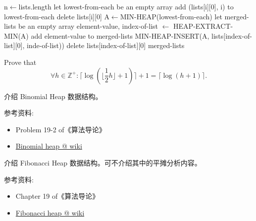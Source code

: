 \documentclass[a4paper, justified]{tufte-handout}
\begin{document}
\begin{problem}[TC 6.5-9]
\end{problem}

\begin{solution}
  \begin{algorithm}
    \begin{algorithmic}
      \State n$\gets$lists.length
      \State let lowest-from-each be an empty array
      \State add (lists[i][0], i) to lowest-from-each
      \State delete lists[i][0]
      \EndFor
      \State A$\gets$MIN-HEAP(lowest-from-each)
      \State let merged-lists be an empty array
      \State element-value, index-of-list $\gets$ HEAP-EXTRACT-MIN(A)
      \State add element-value to merged-lists
      \State MIN-HEAP-INSERT(A, lists[index-of-list][0], inde-of-list))
      \State delete lists[index-of-list][0]
      \EndIf
      \EndWhile
      \Return merged-lists
      \EndProcedure
    \end{algorithmic}
  \end{algorithm}
\end{solution}

\beginoptional

\begin{problem}
Prove that
\[
  \forall h \in \mathbb{Z}^{+}: \lceil \log(\lfloor \frac{1}{2}h \rfloor + 1) \rceil + 1 = \lceil \log (h + 1) \rceil.
\]
\end{problem}

\begin{solution}
\end{solution}

\beginot

\begin{ot}
  介绍 Binomial Heap 数据结构。

  \noindent 参考资料:
  \begin{itemize}
    \item Problem 19-2 of《算法导论》
    \item \href{https://en.wikipedia.org/wiki/Binomial\_heap}{Binomial heap @ wiki}
  \end{itemize}
\end{ot}

\begin{ot}
  介绍 Fibonacci Heap 数据结构。可不介绍其中的平摊分析内容。

  \noindent 参考资料:
  \begin{itemize}
    \item Chapter 19 of《算法导论》
    \item \href{https://en.wikipedia.org/wiki/Fibonacci\_heap}{Fibonacci heap @ wiki}
  \end{itemize}
\end{ot}
\end{document}
